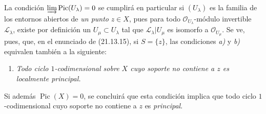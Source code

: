 \begin{remark}[21.13.16]
La condición $\varinjlim\operatorname{Pic}(U_\lambda)=0$ se cumplirá en particular
si $(U_\lambda)$ es la familia de los entornos abiertos de \emph{un punto} $z\in X$,
pues para todo $\mathcal O_{U_\lambda}$-módulo invertible $\mathscr L_\lambda$, existe
por definición un $U_\mu\subset U_\lambda$ tal que
$\mathscr L_\lambda|U_\mu$ es isomorfo a $\mathcal O_{U_\mu}$. Se ve, pues, que,
en el enunciado de (21.13.15), si $S=\{z\}$, las condiciones \emph{a)} y \emph{b)} equivalen
también a la siguiente:
\begin{enumerate}
  \item[c)] \emph{Todo ciclo $1$-codimensional sobre $X$ cuyo soporte no contiene
  a $z$ es localmente principal.}
\end{enumerate}
Si además $\operatorname{Pic}(X)=0$, se concluirá que esta condición implica que
todo ciclo $1$-codimensional cuyo soporte no contiene a $z$ es \emph{principal}.
\end{remark}
